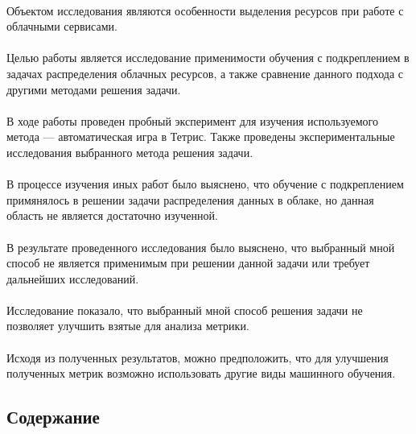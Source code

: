\documentclass{article}
\begin{document}
~\\
Объектом исследования являются особенности выделения ресурсов при работе с облачными сервисами.\\
~\\
Целью работы является исследование применимости обучения с подкреплением в задачах распределения облачных ресурсов, а также сравнение данного подхода с другими методами решения задачи. \\
~\\
В ходе работы проведен пробный эксперимент для изучения используемого метода — автоматическая игра в Тетрис. Также проведены экспериментальные исследования выбранного метода решения задачи.\\
~\\
В процессе изучения иных работ было выяснено, что обучение с подкреплением примянялось в решении задачи распределения данных в облаке, но данная область не является достаточно изученной.\\
~\\
В результате проведенного исследования было выяснено, что выбранный мной способ не является применимым при решении данной задачи или требует дальнейших исследований.\\
~\\
Исследование показало, что выбранный мной способ решения задачи не позволяет улучшить взятые для анализа метрики.\\
~\\
Исходя из полученных результатов, можно предположить, что для улучшения полученных метрик возможно использовать другие виды машинного обучения.
\newpage
\begin{center}
\section {Содержание}
\tableofcontents
\end{center}
\newpage
\end{document}
